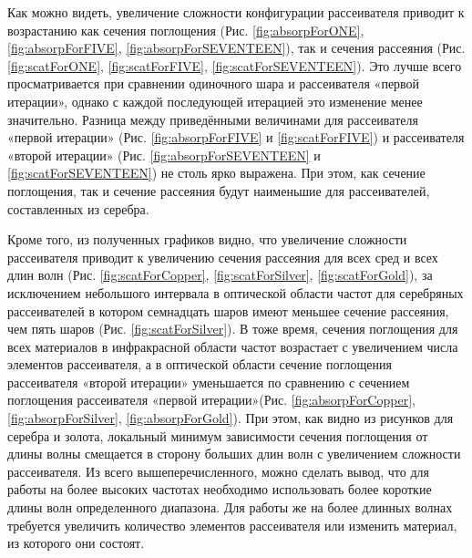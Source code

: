 Как можно видеть, увеличение сложности конфигурации рассеивателя приводит к возрастанию как сечения поглощения  (Рис. \ref{fig:absorpForONE}, \ref{fig:absorpForFIVE}, \ref{fig:absorpForSEVENTEEN}), так и сечения рассеяния (Рис. \ref{fig:scatForONE}, \ref{fig:scatForFIVE}, \ref{fig:scatForSEVENTEEN}). Это лучше всего
просматривается при сравнении одиночного шара и рассеивателя «первой итерации», однако с каждой последующей итерацией это изменение менее значительно. Разница между приведёнными величинами для рассеивателя «первой итерации» (Рис. \ref{fig:absorpForFIVE} и \ref{fig:scatForFIVE}) и рассеивателя «второй итерации» (Рис. \ref{fig:absorpForSEVENTEEN} и \ref{fig:scatForSEVENTEEN}) не столь ярко выражена. При этом, как сечение поглощения, так и сечение рассеяния будут наименьшие для рассеивателей, составленных из серебра.
 
Кроме того, из полученных графиков видно, что увеличение сложности рассеивателя приводит к увеличению сечения рассеяния для всех сред и всех длин волн (Рис. \ref{fig:scatForCopper}, \ref{fig:scatForSilver}, \ref{fig:scatForGold}), за исключением небольшого интервала в оптической области частот для серебряных рассеивателей в котором семнадцать шаров имеют меньшее сечение рассеяния, чем пять шаров (Рис. \ref{fig:scatForSilver}). В тоже время, сечения поглощения для всех материалов в инфракрасной области частот возрастает с увеличением числа элементов рассеивателя, а в оптической области сечение поглощения рассеивателя «второй итерации» уменьшается по сравнению с сечением поглощения рассеивателя «первой итерации»(Рис. \ref{fig:absorpForCopper}, \ref{fig:absorpForSilver}, \ref{fig:absorpForGold}).
При этом, как видно из рисунков для серебра и золота, локальный минимум зависимости сечения поглощения от длины волны смещается в сторону больших длин волн с увеличением сложности рассеивателя.
Из всего вышеперечисленного, можно сделать вывод, что для работы на более высоких частотах необходимо использовать более короткие длины волн определенного диапазона. Для работы же на более длинных волнах требуется увеличить количество элементов рассеивателя или изменить материал, из которого они состоят.\\

